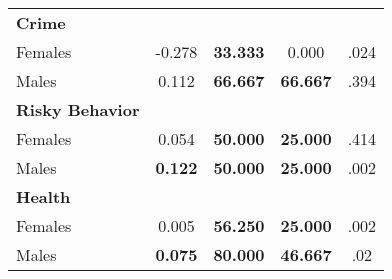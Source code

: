 \begin{tabular}{l c c c c}
\midrule
\textbf{Crime} & & & & \\
\quad Females &     -0.278 & \textbf{   33.333} &     0.000 & .024 \\
\quad Males &      0.112 & \textbf{   66.667} & \textbf{   66.667} & .394 \\
\midrule
\textbf{Risky Behavior} & & & & \\
\quad Females &      0.054 & \textbf{   50.000} & \textbf{   25.000} & .414 \\
\quad Males &  \textbf{    0.122} & \textbf{   50.000} & \textbf{   25.000} & .002 \\
\midrule
\textbf{Health} & & & & \\
\quad Females &      0.005 & \textbf{   56.250} & \textbf{   25.000} & .002 \\
\quad Males &  \textbf{    0.075} & \textbf{   80.000} & \textbf{   46.667} & .02 \\
\bottomrule
\end{tabular}
